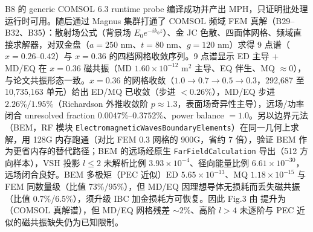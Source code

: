 B8 的 generic COMSOL 6.3 runtime probe 编译成功并产出 MPH，只证明批处理运行时可用。随后通过 Magnus 集群打通了 COMSOL 频域 FEM 真解（B29--B32、B35）：散射场公式（背景场 $E_0 e^{-ik_0 z}$）、金 JC 色散、四面体网格、频域直接求解器，对双金盘（$a=250$ nm、$t=80$ nm、$g=120$ nm）求得 9 点谱（$x=0.26$--$0.42$）与 $x=0.36$ 的四档网格收敛序列。9 点谱显示 ED 主导 + MD/EQ 在 $x=0.36$ 磁共振（MD $1.60\times10^{-12}$ m$^2$ 主导、EQ 伴生、MQ $\approx0$），与论文共振形态一致。$x=0.36$ 的网格收敛（$1.0\to0.7\to0.5\to0.3$，292,687 至 10,735,163 单元）给出 ED/MQ 已收敛（步进 $<0.26\%$），MD/EQ 步进 $2.26\%/1.95\%$（Richardson 外推收敛阶 $p\approx1.3$，表面场奇异性主导），远场/功率闭合 unresolved fraction $0.0047\%$--$0.3752\%$、power balance $=1.0$。另以边界元法（BEM，RF 模块 \texttt{ElectromagneticWavesBoundaryElements}）在同一几何上求解，用 128G 内存跑通（对比 FEM 0.3 网格的 900G，省约 7 倍），验证 BEM 作为更省内存的替代路径；BEM 的远场经原生 \texttt{FarFieldCalculation} 导出（512 方向样本），VSH 投影 $l\le2$ 未解析比例 $3.93\times10^{-4}$、径向能量比例 $6.61\times10^{-30}$，远场闭合良好。BEM 多极矩（PEC 近似）ED $5.65\times10^{-13}$、MQ $1.18\times10^{-15}$ 与 FEM 同数量级（比值 73\%/95\%），但 MD/EQ 因理想导体无损耗而丢失磁共振（比值 0.7\%/6.5\%），须升级 IBC 加金损耗方可恢复。因此 Fig.3 由  提升为 （COMSOL 真解谱），但 MD/EQ 网格残差 $\sim2\%$、高阶 $l>4$ 未逐阶与 PEC 近似的磁共振缺失仍为已知限制。
